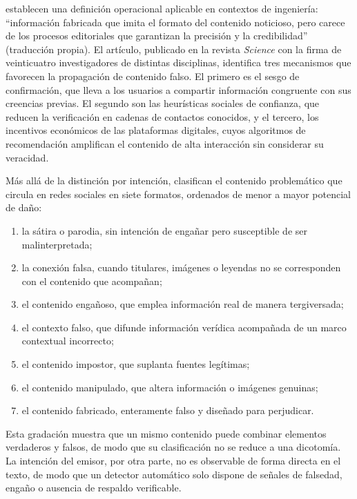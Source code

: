 \textcite[1094]{LazerEtAl2018} establecen una definición operacional aplicable en contextos de ingeniería: \enquote{información fabricada que imita el formato del contenido noticioso, pero carece de los procesos editoriales que garantizan la precisión y la credibilidad} (traducción propia). El artículo, publicado en la revista \textit{Science} con la firma de veinticuatro investigadores de distintas disciplinas, identifica tres mecanismos que favorecen la propagación de contenido falso. El primero es el sesgo de confirmación, que lleva a los usuarios a compartir información congruente con sus creencias previas. El segundo son las heurísticas sociales de confianza, que reducen la verificación en cadenas de contactos conocidos, y el tercero, los incentivos económicos de las plataformas digitales, cuyos algoritmos de recomendación amplifican el contenido de alta interacción sin considerar su veracidad.

Más allá de la distinción por intención, \textcite{WardleDerakhshan2017} clasifican el contenido problemático que circula en redes sociales en siete formatos, ordenados de menor a mayor potencial de daño:

\begin{enumerate}
    \item la sátira o parodia, sin intención de engañar pero susceptible de ser malinterpretada;
    \item la conexión falsa, cuando titulares, imágenes o leyendas no se corresponden con el contenido que acompañan;
    \item el contenido engañoso, que emplea información real de manera tergiversada;
    \item el contexto falso, que difunde información verídica acompañada de un marco contextual incorrecto;
    \item el contenido impostor, que suplanta fuentes legítimas;
    \item el contenido manipulado, que altera información o imágenes genuinas;
    \item el contenido fabricado, enteramente falso y diseñado para perjudicar.
\end{enumerate}
 Esta gradación muestra que un mismo contenido puede combinar elementos verdaderos y falsos, de modo que su clasificación no se reduce a una dicotomía. La intención del emisor, por otra parte, no es observable de forma directa en el texto, de modo que un detector automático solo dispone de señales de falsedad, engaño o ausencia de respaldo verificable.

